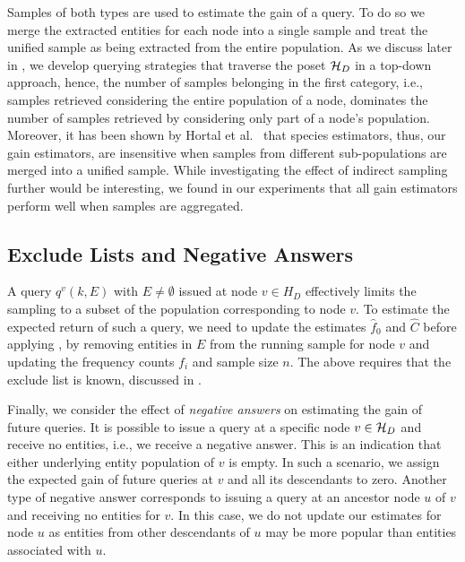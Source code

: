 Samples of both types are used to estimate the gain of a query. To do so we merge the extracted entities for each node into a single sample and treat the unified sample as being extracted from the entire population. As we discuss later in , we develop querying strategies that traverse the poset $\mathcal{H}_D$ in a top-down approach, hence, the number of samples belonging in the first category, i.e., samples retrieved considering the entire population of a node, dominates the number of samples retrieved by considering only part of a node's population. 
\iftr
Moreover, it has been shown by Hortal et al.~\cite{hortal2006evaluating} that species estimators, thus, our gain estimators, are insensitive when samples from different sub-populations are merged into a unified sample. 
While investigating the effect of indirect sampling further would be interesting, we found in our experiments that all gain estimators perform well when samples are aggregated.
\fi

\subsection{Exclude Lists and Negative Answers}
\label{sec:excludelist}
A query $q^v(k, E)$ with $E \ne \emptyset$ issued at node $v \in H_D$ effectively limits the sampling to a subset of the population corresponding to node $v$. To estimate the expected return of such a query, we need to update the estimates $\hat{f}_0$ and $\hat{C}$ before applying , by removing entities in $E$ from the running sample for node $v$ and updating the frequency counts $f_i$ and sample size $n$. The above requires that the exclude list is known, discussed in .

Finally, we consider the effect of {\em negative answers} on estimating the gain of future queries. It is possible to issue a query at a specific node $v \in \mathcal{H}_D$ and receive no entities, i.e., we receive a negative answer. This is an indication that either underlying entity population of $v$ is empty. In such a scenario, we assign the expected gain of future queries at $v$ and all its descendants to zero. Another type of negative answer corresponds to issuing a query at an ancestor node $u$ of $v$ and receiving no entities for $v$. In this case, we do not update our estimates for node $u$ as entities from other descendants of $u$ may be more popular than entities associated with $u$.

